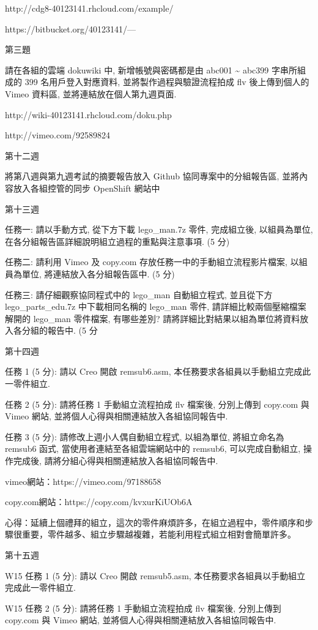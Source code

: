 \documentclass[]{article}
\begin{document}
http://cdg8-40123141.rhcloud.com/example/

https://bitbucket.org/40123141/---

第三題

請在各組的雲端 dokuwiki 中, 新增帳號與密碼都是由 abc001
\textasciitilde{} abc399 字串所組成的 399 名用戶登入對應資料,
並將製作過程與驗證流程拍成 flv 後上傳到個人的 Vimeo 資料區,
並將連結放在個人第九週頁面.

http://wiki-40123141.rhcloud.com/doku.php

http://vimeo.com/92589824

第十二週

將第八週與第九週考試的摘要報告放入 Github 協同專案中的分組報告區,
並將內容放入各組控管的同步 OpenShift 網站中

第十三週

任務一: 請以手動方式, 從下方下載 lego\_man.7z 零件, 完成組立後,
以組員為單位, 在各分組報告區詳細說明組立過程的重點與注意事項. (5 分)

任務二: 請利用 Vimeo 及 copy.com 存放任務一中的手動組立流程影片檔案,
以組員為單位, 將連結放入各分組報告區中. (5 分)

任務三: 請仔細觀察協同程式中的 lego\_man 自動組立程式, 並且從下方
lego\_parts\_edu.7z 中下載相同名稱的 lego\_man 零件,
請詳細比較兩個壓縮檔案解開的 lego\_man 零件檔案, 有哪些差別?
請將詳細比對結果以組為單位將資料放入各分組的報告中. (5 分

第十四週

任務 1 (5 分): 請以 Creo 開啟 remsub6.asm,
本任務要求各組員以手動組立完成此一零件組立.

任務 2 (5 分): 請將任務 1 手動組立流程拍成 flv 檔案後, 分別上傳到
copy.com 與 Vimeo 網站, 並將個人心得與相關連結放入各組協同報告中.

任務 3 (5 分): 請修改上週小人偶自動組立程式, 以組為單位, 將組立命名為
remsub6 函式, 當使用者連結至各組雲端網站中的 remsub6, 可以完成自動組立,
操作完成後, 請將分組心得與相關連結放入各組協同報告中.

vimeo網站：https://vimeo.com/97188658

copy.com網站：https://copy.com/kvxurKiUOb6A

心得：延續上個禮拜的組立，這次的零件麻煩許多，在組立過程中，零件順序和步驟很重要，零件越多、組立步驟越複雜，若能利用程式組立相對會簡單許多。

第十五週

W15 任務 1 (5 分): 請以 Creo 開啟 remsub5.asm,
本任務要求各組員以手動組立完成此一零件組立.

W15 任務 2 (5 分): 請將任務 1 手動組立流程拍成 flv 檔案後, 分別上傳到
copy.com 與 Vimeo 網站, 並將個人心得與相關連結放入各組協同報告中.
\end{document}

